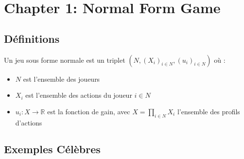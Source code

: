 \section{Chapter 1: Normal Form Game} %

\subsection{Définitions} %
\begin{definition}
Un jeu sous forme normale est un triplet $(N, (X_i)_{i \in N}, (u_i)_{i \in N})$ où : %
\begin{itemize}
    \item $N$ est l'ensemble des joueurs %
    \item $X_i$ est l'ensemble des actions du joueur $i \in N$ %
    \item $u_i: X \rightarrow \mathbb{R}$ est la fonction de gain, avec $X = \prod_{i \in N} X_i$ l'ensemble des profils d'actions %
\end{itemize}
\end{definition}

\subsection{Exemples Célèbres} %

